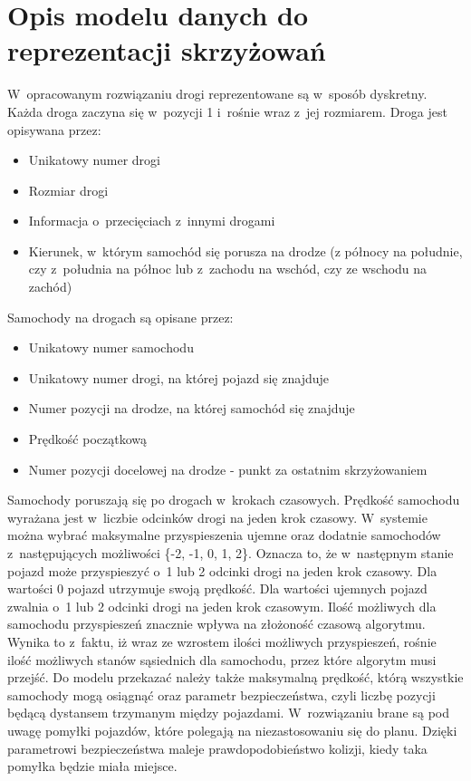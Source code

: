  \label{chap:implementation}

\section{Opis modelu danych do reprezentacji skrzyżowań}

W~opracowanym rozwiązaniu drogi reprezentowane są w~sposób dyskretny. Każda droga zaczyna się w~pozycji 1 i~rośnie wraz z~jej rozmiarem. Droga jest opisywana przez:
\begin{itemize}
\item Unikatowy numer drogi
\item Rozmiar drogi
\item Informacja o~przecięciach z~innymi drogami
\item Kierunek, w~którym samochód się porusza na drodze (z północy na południe, czy z~południa na północ lub z~zachodu na wschód, czy ze wschodu na zachód)
\end{itemize}
Samochody na drogach są opisane przez:
\begin{itemize}
\item Unikatowy numer samochodu
\item Unikatowy numer drogi, na której pojazd się znajduje
\item Numer pozycji na drodze, na której samochód się znajduje
\item Prędkość początkową
\item Numer pozycji docelowej na drodze - punkt za ostatnim skrzyżowaniem
\end{itemize}
Samochody poruszają się po drogach w~krokach czasowych. Prędkość samochodu wyrażana jest w~liczbie odcinków drogi na jeden krok czasowy.
\newline
\indent
W~systemie można wybrać maksymalne przyspieszenia ujemne oraz dodatnie samochodów z~następujących możliwości \{-2, -1, 0, 1, 2\}. Oznacza to, że w~następnym stanie pojazd może przyspieszyć o~1 lub 2 odcinki drogi na jeden krok czasowy. Dla wartości 0 pojazd utrzymuje swoją prędkość. Dla wartości ujemnych pojazd zwalnia o~1 lub 2 odcinki drogi na jeden krok czasowym. Ilość możliwych dla samochodu przyspieszeń znacznie wpływa na złożoność czasową algorytmu. Wynika to z~faktu, iż wraz ze wzrostem ilości możliwych przyspieszeń, rośnie ilość możliwych stanów sąsiednich dla samochodu, przez które algorytm musi przejść.        
\newline
\indent
Do modelu przekazać należy także maksymalną prędkość, którą wszystkie samochody mogą osiągnąć oraz parametr bezpieczeństwa, czyli liczbę pozycji będącą dystansem trzymanym między pojazdami. W~rozwiązaniu brane są pod uwagę pomyłki pojazdów, które polegają na niezastosowaniu się do planu. Dzięki parametrowi bezpieczeństwa maleje prawdopodobieństwo kolizji, kiedy taka pomyłka będzie miała miejsce.

